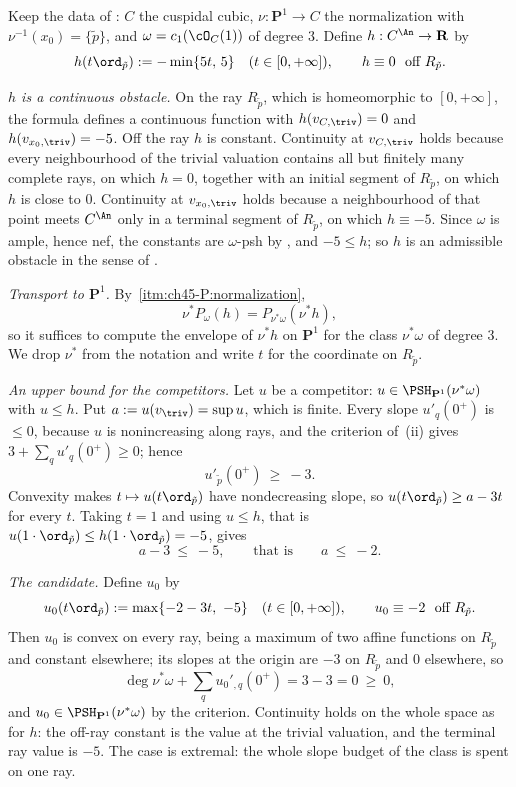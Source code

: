 \begin{example}
\label{ex:ch45-cuspidal-envelope}
Keep the data of : $C$ the cuspidal cubic,
$\nu:\mathbf P^1\to C$ the normalization with
$\nu^{-1}(x_0)=\{\tilde p\}$, and $\omega=c_1(\cO_C(1))$ of degree
$3$.  Define $h:C^{\An}\to\mathbf R$ by
\[
 h(t\ord_{\tilde p}):=-\min\{5t,\,5\}\quad(t\in[0,+\infty]),
 \qquad
 h\equiv0\ \text{ off } R_{\tilde p} .
\]

\emph{$h$ is a continuous obstacle.}  On the ray $R_{\tilde p}$, which
is homeomorphic to $[0,+\infty]$, the formula defines a continuous
function with $h(v_{C,\triv})=0$ and $h(v_{x_0,\triv})=-5$.  Off the ray
$h$ is constant.  Continuity at $v_{C,\triv}$ holds because every
neighbourhood of the trivial valuation contains all but finitely many
complete rays, on which $h=0$, together with an initial segment of
$R_{\tilde p}$, on which $h$ is close to $0$.  Continuity at
$v_{x_0,\triv}$ holds because a neighbourhood of that point meets
$C^{\An}$ only in a terminal segment of $R_{\tilde p}$, on which
$h\equiv-5$.  Since $\omega$ is ample, hence nef, the constants are
$\omega$-psh by , and $-5\le h$; so $h$ is
an admissible obstacle in the sense of
.

\emph{Transport to $\mathbf P^1$.}  By
\,\cref{itm:ch45-P:normalization},
\[
 \nu^*P_\omega(h)=P_{\nu^*\omega}(\nu^*h),
\]
so it suffices to compute the envelope of $\nu^*h$ on $\mathbf P^1$ for
the class $\nu^*\omega$ of degree $3$.  We drop $\nu^*$ from the
notation and write $t$ for the coordinate on $R_{\tilde p}$.

\emph{An upper bound for the competitors.}  Let $u$ be a competitor:
$u\in\PSH_{\mathbf P^1}(\nu^*\omega)$ with $u\le h$.  Put
$a:=u(v_{\triv})=\sup u$, which is finite.  Every slope
$u'_q(0^+)$ is $\le0$, because $u$ is nonincreasing along rays, and
the criterion of \,(ii) gives
$3+\sum_qu'_q(0^+)\ge0$; hence
\[
 u'_{\tilde p}(0^+)\ \ge\ -3 .
\]
Convexity makes $t\mapsto u(t\ord_{\tilde p})$ have nondecreasing slope,
so $u(t\ord_{\tilde p})\ge a-3t$ for every $t$.  Taking $t=1$ and
using $u\le h$, that is $u(1\cdot\ord_{\tilde p})\le h(1\cdot\ord_{\tilde
p})=-5$, gives
\[
 a-3\ \le\ -5,
 \qquad\text{that is}\qquad
 a\ \le\ -2 .
\]

\emph{The candidate.}  Define $u_0$ by
\[
 u_0(t\ord_{\tilde p}):=\max\{-2-3t,\ -5\}\quad(t\in[0,+\infty]),
 \qquad
 u_0\equiv-2\ \text{ off }R_{\tilde p}.
\]
Then $u_0$ is convex on every ray, being a maximum of two affine functions
on $R_{\tilde p}$ and constant elsewhere; its slopes at the origin are
$-3$ on $R_{\tilde p}$ and $0$ elsewhere, so
\[
 \deg\nu^*\omega+\sum_qu_0'{}_{,q}(0^+)=3-3=0\ \ge\ 0,
\]
and $u_0\in\PSH_{\mathbf P^1}(\nu^*\omega)$ by the criterion.
Continuity holds on the whole space as for $h$: the off-ray constant is
the value at the trivial valuation, and the terminal ray value is $-5$.  The case is
extremal: the whole slope budget of the class is spent on one ray.


\end{example}
